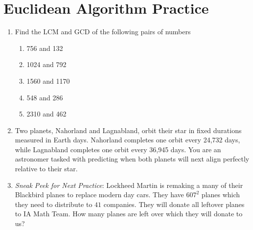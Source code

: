 \documentclass[a4paper]{article}
\begin{document}
\section{Euclidean Algorithm Practice}
\begin{enumerate}
    \item Find the LCM and GCD of the following pairs of numbers\: 
    \begin{enumerate}
    \item 756 and 132
    \item 1024 and 792
    \item 1560 and 1170
    \item 548 and 286
    \item 2310 and 462
    \end{enumerate}
    
    \item Two planets, Nahorland and Lagnabland, orbit their star in fixed durations measured in Earth days. Nahorland completes one orbit every 24,732 days, while Lagnabland completes one orbit every 36,945 days. You are an astronomer tasked with predicting when both planets will next align perfectly relative to their star.

    \item \textit{Sneak Peek for Next Practice}: Lockheed Martin is remaking a many of their Blackbird planes to replace modern day cars. They have $607^2$ planes which they need to distribute to $41$ companies. They will donate all leftover planes to IA Math Team. How many planes are left over which they will donate to us?
\end{enumerate}
\end{document}
